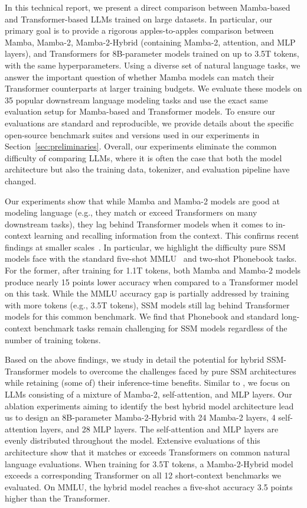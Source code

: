 In this technical report, we present a direct comparison between Mamba-based and Transformer-based LLMs trained on large datasets. In particular, our primary goal is to provide a rigorous apples-to-apples comparison between Mamba, Mamba-2, Mamba-2-Hybrid (containing Mamba-2, attention, and MLP layers), and Transformers for 8B-parameter models trained on up to 3.5T tokens, with the same hyperparameters. Using a diverse set of natural language tasks, we answer the important question of whether Mamba models can match their Transformer counterparts at larger training budgets. We evaluate these models on 35 popular downstream language modeling tasks and use the exact same evaluation setup for Mamba-based and Transformer models. To ensure our evaluations are standard and reproducible, we provide details about the specific open-source benchmark suites and versions used in our experiments in Section~\ref{sec:preliminaries}.
Overall, our experiments eliminate the common difficulty of comparing LLMs, where it is often the case that both the model architecture but also the training data, tokenizer, and evaluation pipeline have changed.

Our experiments show that while Mamba and Mamba-2 models are good at modeling language (e.g., they match or exceed Transformers on many downstream tasks), they lag behind Transformer models when it comes to in-context learning and recalling information from the context. This confirms recent findings at smaller scales~\citep{park2024can}. In particular, we highlight the difficulty pure SSM models face with the standard five-shot MMLU~\citep{hendrycks2020measuring} and two-shot Phonebook tasks. For the former, after training for 1.1T tokens, both Mamba and Mamba-2 models produce nearly 15 points lower accuracy when compared to a Transformer model on this task. While the MMLU accuracy gap is partially addressed by training with more tokens (e.g., 3.5T tokens), SSM models still lag behind Transformer models for this common benchmark. We find that Phonebook and standard long-context benchmark tasks remain challenging for SSM models regardless of the number of training tokens.

Based on the above findings, we study in detail the potential for hybrid SSM-Transformer models to overcome the challenges faced by pure SSM architectures while retaining (some of) their inference-time benefits. Similar to \cite{lieber2024jamba}, we focus on LLMs consisting of a mixture of Mamba-2, self-attention, and MLP layers. Our ablation experiments aiming to identify the best hybrid model architecture lead us to design an 8B-parameter Mamba-2-Hybrid with 24 Mamba-2 layers, 4 self-attention layers, and 28 MLP layers. The self-attention and MLP layers are evenly distributed throughout the model. Extensive evaluations of this architecture show that it matches or exceeds Transformers on common natural language evaluations. When training for 3.5T tokens, a Mamba-2-Hybrid model exceeds a corresponding Transformer on all 12 short-context benchmarks we evaluated. On MMLU, the hybrid model reaches a five-shot accuracy 3.5 points higher than the Transformer. 

